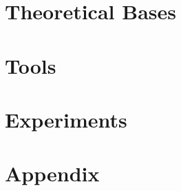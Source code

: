 \documentclass[a4paper,twoside,openright,titlepage,
               headinclude,footinclude,BCOR5mm,
               numbers=noenddot,cleardoublepage=empty,
               tablecaptionabove]{scrbook}
\begin{document}
	\frontmatter
%	
%	
%	
	
%	
	
	
	
	
	
		
	\tableofcontents
	
	\mainmatter
	\part{Theoretical Bases}

	
	
	
	\part{Tools}
	
	
	\part{Experiments}
	
	
	
	\appendix
	\part{Appendix}
	
	\backmatter
	
\end{document}
